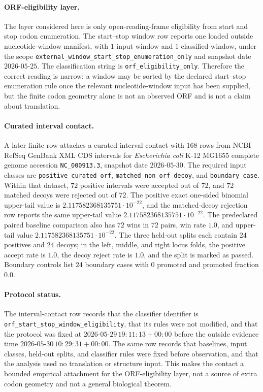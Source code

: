\paragraph{ORF-eligibility layer.}
The layer considered here is only open-reading-frame eligibility from start and stop codon enumeration.  The start--stop window row reports one loaded outside nucleotide-window manifest, with $1$ input window and $1$ classified window, under the scope \texttt{external\_window\_start\_stop\_enumeration\_only} and snapshot date $2026$-$05$-$25$.  The classification string is \texttt{orf\_eligibility\_only}.  Therefore the correct reading is narrow: a window may be sorted by the declared start--stop enumeration rule once the relevant nucleotide-window input has been supplied, but the finite codon geometry alone is not an observed ORF and is not a claim about translation.

\paragraph{Curated interval contact.}
A later finite row attaches a curated interval contact with $168$ rows from NCBI RefSeq GenBank XML CDS intervals for \emph{Escherichia coli} K-12 MG1655 complete genome accession \texttt{NC\_000913.3}, snapshot date $2026$-$05$-$30$.  The required input classes are \texttt{positive\_curated\_orf}, \texttt{matched\_non\_orf\_decoy}, and \texttt{boundary\_case}.  Within that dataset, $72$ positive intervals were accepted out of $72$, and $72$ matched decoys were rejected out of $72$.  The positive exact one-sided binomial upper-tail value is $2.117582368135751\cdot 10^{-22}$, and the matched-decoy rejection row reports the same upper-tail value $2.117582368135751\cdot 10^{-22}$.  The predeclared paired baseline comparison also has $72$ wins in $72$ pairs, win rate $1.0$, and upper-tail value $2.117582368135751\cdot 10^{-22}$.  The three held-out splits each contain $24$ positives and $24$ decoys; in the left, middle, and right locus folds, the positive accept rate is $1.0$, the decoy reject rate is $1.0$, and the split is marked as passed.  Boundary controls list $24$ boundary cases with $0$ promoted and promoted fraction $0.0$.

\paragraph{Protocol status.}
The interval-contact row records that the classifier identifier is \texttt{orf\_start\_stop\_window\_eligibility}, that its rules were not modified, and that the protocol was fixed at $2026$-$05$-$29\,19{:}11{:}13+00{:}00$ before the outside evidence time $2026$-$05$-$30\,10{:}29{:}31+00{:}00$.  The same row records that baselines, input classes, held-out splits, and classifier rules were fixed before observation, and that the analysis used no translation or structure input.  This makes the contact a bounded empirical attachment for the ORF-eligibility layer, not a source of extra codon geometry and not a general biological theorem.

